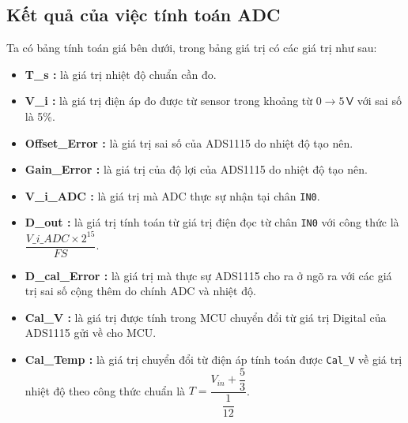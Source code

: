\subsection{Kết quả của việc tính toán ADC}

Ta có bảng tính toán giá bên dưới, trong bảng giá trị có các giá trị như sau:

\begin{itemize}[label=-]
	\item \textbf{T\_s :} là giá trị nhiệt độ chuẩn cần đo.
	\item \textbf{V\_i :} là giá trị điện áp đo được từ sensor trong khoảng từ $0\rightarrow 5\,\textsf{V}$ với sai số là 5\%.
	\item \textbf{Offset\_Error :} là giá trị sai số của ADS1115 do nhiệt độ tạo nên.
	\item \textbf{Gain\_Error :} là giá trị của độ lợi của ADS1115 do nhiệt độ tạo nên.
	\item \textbf{V\_i\_ADC :} là giá trị mà ADC thực sự nhận tại chân \texttt{IN0}.
	\item \textbf{D\_out :} là giá trị tính toán từ giá trị điện đọc từ chân \texttt{IN0} với công thức là $\dfrac{V\_i\_ADC \times 2^{15}}{FS}$.
	\item \textbf{D\_cal\_Error :} là giá trị mà thực sự ADS1115 cho ra ở ngõ ra với các giá trị sai số cộng thêm do chính ADC và nhiệt độ.
	\item \textbf{Cal\_V :} là giá trị được tính trong MCU chuyển đổi từ giá trị Digital của ADS1115 gửi về cho MCU.
	\item \textbf{Cal\_Temp :} là giá trị chuyển đổi từ điện áp tính toán được \texttt{Cal\_V} về giá trị nhiệt độ theo công thức chuẩn là $T = \dfrac{V_{in} + \dfrac{5}{3}}{\dfrac{1}{12}}$.
\end{itemize}

\begin{landscape}
	
\end{landscape}